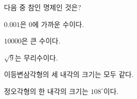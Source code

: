 다음 중 참인 명제인 것은?
\begin{choicesv}{\rule[-3ex]{0pt}{8ex}$0.001$은 $0$에 가까운 수이다.}{\rule[-3ex]{0pt}{8ex}$10000$은 큰 수이다.}{\rule[-3ex]{0pt}{8ex}$\sqrt{9}$는 무리수이다.}{\rule[-3ex]{0pt}{8ex}이등변삼각형의 세 내각의 크기는 모두 같다.}{\rule[-3ex]{0pt}{8ex}정오각형의 한 내각의 크기는 $108^\circ$이다.}\end{choicesv}
